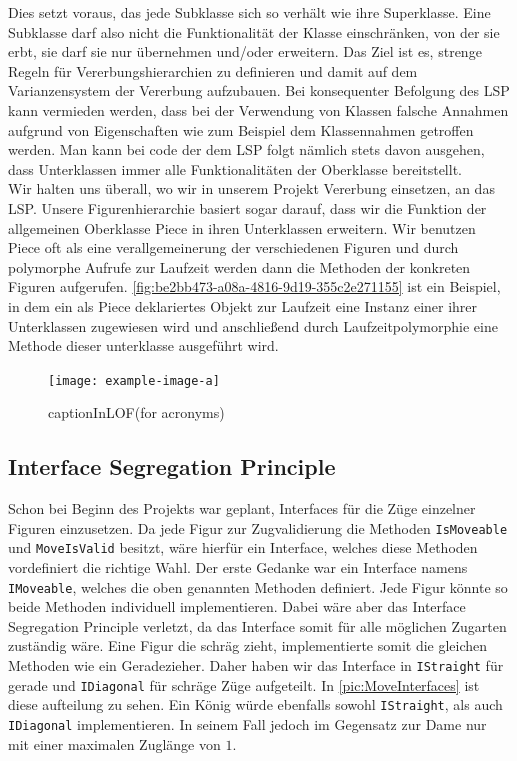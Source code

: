 \documentclass[
10pt, %
a4paper, %
oneside, %
headinclude,footinclude, %
BCOR5mm, %
]{scrartcl}
\begin{document}
\begin{onehalfspace}
Dies setzt voraus, das jede Subklasse sich so verhält wie ihre Superklasse. Eine Subklasse darf also nicht die Funktionalität der Klasse einschränken, von der sie erbt, sie darf sie nur übernehmen und/oder erweitern. Das Ziel ist es, strenge Regeln für Vererbungshierarchien zu definieren und damit auf dem Varianzensystem der Vererbung aufzubauen. Bei konsequenter Befolgung des LSP kann vermieden werden, dass bei der Verwendung von Klassen falsche Annahmen aufgrund von Eigenschaften wie zum Beispiel dem Klassennahmen getroffen werden. Man kann bei code der dem LSP folgt nämlich stets davon ausgehen, dass Unterklassen immer alle Funktionalitäten der Oberklasse bereitstellt.
\\
Wir halten uns überall, wo wir in unserem Projekt Vererbung einsetzen, an das LSP. Unsere Figurenhierarchie basiert sogar darauf, dass wir die Funktion der allgemeinen Oberklasse Piece in ihren Unterklassen erweitern. Wir benutzen Piece oft als eine verallgemeinerung der verschiedenen Figuren und durch polymorphe Aufrufe zur Laufzeit werden dann die Methoden der konkreten Figuren aufgerufen. \autoref{fig:be2bb473-a08a-4816-9d19-355c2e271155} ist ein Beispiel, in dem ein als Piece deklariertes Objekt zur Laufzeit eine Instanz einer ihrer Unterklassen zugewiesen wird und anschließend durch Laufzeitpolymorphie eine Methode dieser unterklasse ausgeführt wird.

\begin{figure}[ht]
	\texttt{[image: example-image-a]}
	\caption[captionInLOF(for acronyms)]{captionInLOF(for acronyms)}
	\label{fig:be2bb473-a08a-4816-9d19-355c2e271155}
\end{figure}

\subsection{Interface Segregation Principle}
Schon bei Beginn des Projekts war geplant, Interfaces für die Züge einzelner Figuren einzusetzen. Da jede Figur zur Zugvalidierung die Methoden \texttt{IsMoveable} und \texttt{MoveIsValid} besitzt, wäre hierfür ein Interface, welches diese Methoden vordefiniert die richtige Wahl. Der erste Gedanke war ein Interface namens \texttt{IMoveable}, welches die oben genannten Methoden definiert. Jede Figur könnte so beide Methoden individuell implementieren. Dabei wäre aber das Interface Segregation Principle verletzt, da das Interface somit für alle möglichen Zugarten zuständig wäre. Eine Figur die schräg zieht, implementierte somit die gleichen Methoden wie ein Geradezieher. Daher haben wir das Interface in \texttt{IStraight} für gerade und \texttt{IDiagonal} für schräge Züge aufgeteilt. In \autoref{pic:MoveInterfaces} ist diese aufteilung zu sehen. Ein König würde ebenfalls sowohl \texttt{IStraight}, als auch \texttt{IDiagonal} implementieren. In seinem Fall jedoch im Gegensatz zur Dame nur mit einer maximalen Zuglänge von $1$.


\end{onehalfspace}
\end{document}
